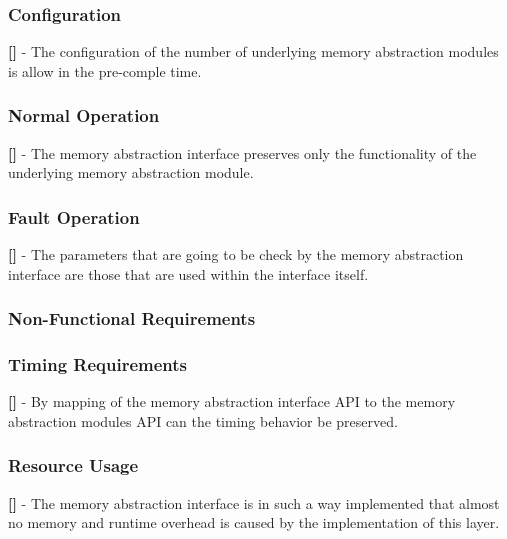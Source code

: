 \subsubsection{Configuration}
{\bf []} - The configuration of the number of underlying memory abstraction modules is allow in the pre-comple time.
\subsubsection{Normal Operation}
{\bf []} - The memory abstraction interface preserves only the functionality of the underlying memory abstraction module.
\subsubsection{Fault Operation}
{\bf []} - The parameters that are going to be check by the memory abstraction interface are those that are used within the interface itself.
\subsubsection{Non-Functional Requirements}
\subsubsection{Timing Requirements}
{\bf []} - By mapping of the memory abstraction interface API to the memory abstraction modules API can the timing behavior be preserved.
\subsubsection{Resource Usage}
{\bf []} - The memory abstraction interface is in such a way implemented that almost no memory and runtime overhead is caused by the implementation of this layer.



